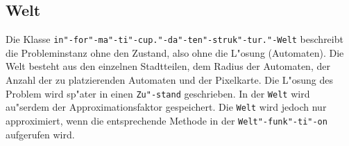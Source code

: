 \subsection{Welt}
Die Klasse \texttt{in"-for"-ma"-ti"-cup."-da"-ten"-struk"-tur."-Welt} beschreibt die Probleminstanz ohne den Zustand, also ohne die L"osung (Automaten). Die Welt besteht aus den einzelnen Stadtteilen, dem Radius der Automaten, der Anzahl der zu platzierenden Automaten und der Pixelkarte. Die L"osung des Problem wird sp"ater in einen \texttt{Zu"-stand} geschrieben. In der \texttt{Welt} wird au"serdem der Approximationsfaktor gespeichert. Die \texttt{Welt} wird jedoch nur approximiert, wenn die entsprechende Methode in der \texttt{Welt"-funk"-ti"-on} aufgerufen wird.
